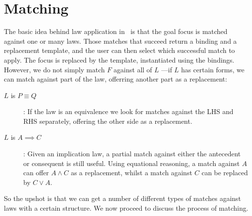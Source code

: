 \section{Matching}
\label{sec:match:foundation}


%
%

The basic idea behind law application in \STHN\ is that
the goal focus is matched against one or many laws.
Those matches that succeed return a binding and a replacement template,
and the user can then select which successful match to apply.
The focus is replaced by the template, instantiated using the bindings.
However, we do not simply match $F$ against all of $L$
---if $L$ has certain forms, we can match against part of the law,
offerring another part as a replacement:
\begin{description}
  \item[$L$ is  $P \equiv Q$]:
    If the law is an equivalence we look for matches against the LHS and RHS
    separately, offering the other side as a replacement.
  \item[$L$ is $A \implies C$]:
    Given an implication law, a partial match against either the antecedent
    or consequent is still useful.
    Using equational reasoning, a match against $A$ can offer $A \land C$
    as a replacement, whilst a match against $C$ can be replaced by $C \lor A$.
\end{description}
So the upshot is that we can get a number of different types of matches
against laws with a certain structure.
We now proceed to discuss the process of matching.

